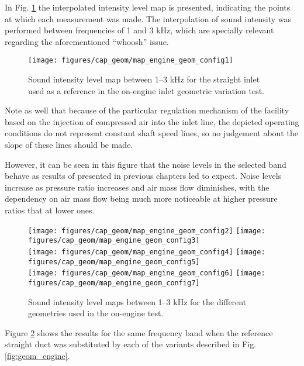 In Fig. \ref{fig:geom_mot_comparison_map1} the interpolated intensity level map is presented, indicating the points at which each measurement was made. The interpolation of sound intensity was performed between frequencies of 1 and 3 kHz, which are specially relevant regarding the aforementioned ``whoosh'' issue.

\begin{figure}[h!]
\centering
\texttt{[image: figures/cap\_geom/map\_engine\_geom\_config1]}
\caption{Sound intensity level map between 1--3 kHz for the straight inlet used as a reference in the on-engine inlet geometric variation test.}
\label{fig:geom_mot_comparison_map1}
\end{figure}

Note as well that because of the particular regulation mechanism of the facility based on the injection of compressed air into the inlet line, the depicted operating conditions do not represent constant shaft speed lines, so no judgement about the slope of these lines should be made.

However, it can be seen in this figure that the noise levels in the selected band behave as results of presented in previous chapters led to expect. Noise levels increase as pressure ratio increases and air mass flow diminishes, with the dependency on air mass flow being much more noticeable at higher pressure ratios that at lower ones.

\begin{figure}[h!]
\centering
\texttt{[image: figures/cap\_geom/map\_engine\_geom\_config2]}\hspace{0.05\textwidth}
\texttt{[image: figures/cap\_geom/map\_engine\_geom\_config3]}\\[2mm]
\texttt{[image: figures/cap\_geom/map\_engine\_geom\_config4]}\hspace{0.05\textwidth}
\texttt{[image: figures/cap\_geom/map\_engine\_geom\_config5]}\\[2mm]
\texttt{[image: figures/cap\_geom/map\_engine\_geom\_config6]}\hspace{0.05\textwidth}
\texttt{[image: figures/cap\_geom/map\_engine\_geom\_config7]}
\caption{Sound intensity level maps between 1--3 kHz for the different geometries used in the on-engine test.}
\label{fig:geom_mot_comparison_maps}
\end{figure}

Figure \ref{fig:geom_mot_comparison_maps} shows the results for the same frequency band when the reference straight duct was substituted by each of the variants described in Fig. \ref{fig:geom_engine}. 

